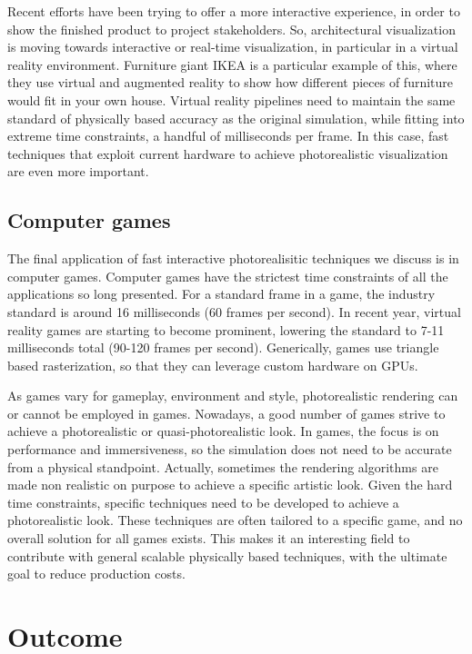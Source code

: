 Recent efforts have been trying to offer a more interactive experience, in order to show the finished product to project stakeholders. So, architectural visualization is moving towards interactive or real-time visualization, in particular in a virtual reality environment. Furniture giant IKEA is a particular example of this, where they use virtual and augmented reality to show how different pieces of furniture would fit in your own house. Virtual reality pipelines need to maintain the same standard of physically based accuracy as the original simulation, while fitting into extreme time constraints, a handful of milliseconds per frame. In this case, fast techniques that exploit current hardware to achieve photorealistic visualization are even more important.


\subsection{Computer games}

The final application of fast interactive photorealisitic techniques we discuss is in computer games. Computer games have the strictest time constraints of all the applications so long presented. For a standard frame in a game, the industry standard is around 16 milliseconds (60 frames per second). In recent year, virtual reality games are starting to become prominent, lowering the standard to 7-11 milliseconds total (90-120 frames per second). Generically, games use triangle based rasterization, so that they can leverage custom hardware on GPUs. 

As games vary for gameplay, environment and style, photorealistic rendering can or cannot be employed in games. Nowadays, a good number of games strive to achieve a photorealistic or quasi-photorealistic look. In games, the focus is on performance and immersiveness, so the simulation does not need to be accurate from a physical standpoint. Actually, sometimes the rendering algorithms are made non realistic on purpose to achieve a specific artistic look. Given the hard time constraints, specific techniques need to be developed to achieve a photorealistic look. These techniques are often tailored to a specific game, and no overall solution for all games exists. This makes it an interesting field to contribute with general scalable physically based techniques, with the ultimate goal to reduce production costs.

\section{Outcome}

